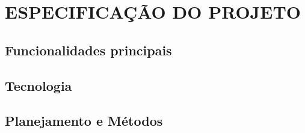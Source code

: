 \chapter{ESPECIFICAÇÃO DO PROJETO} %
\label{cha:especificacao_do_projeto}

\section{Funcionalidades principais} %
\label{sec:funcionalidades_principais}


\section{Tecnologia} %
\label{sec:tecnologia}


\section{Planejamento e Métodos} %
\label{sec:planejamento_e_métodos}



